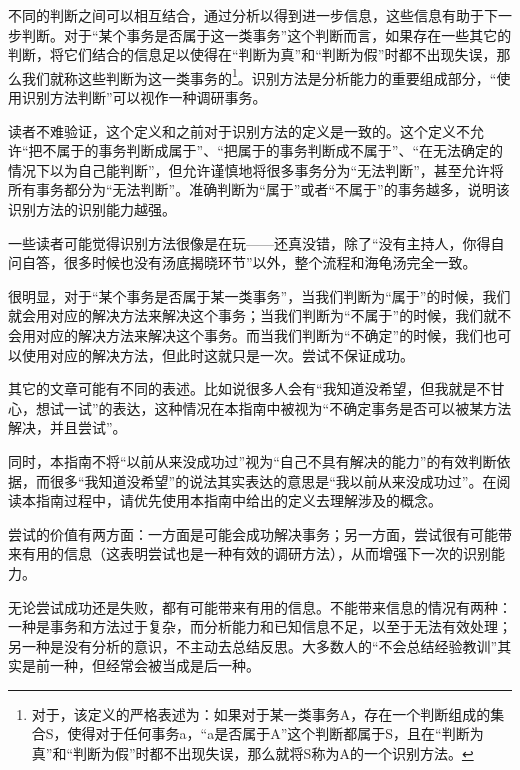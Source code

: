 不同的判断之间可以相互结合，通过分析以得到进一步信息，这些信息有助于下一步判断。对于“某个事务是否属于这一类事务”这个判断而言，如果存在一些其它的判断，将它们结合的信息足以使得在“判断为真”和“判断为假”时都不出现失误，那么我们就称这些判断为这一类事务的\footnote{对于\rigorous，该定义的严格表述为：如果对于某一类事务A，存在一个判断组成的集合S，使得对于任何事务a，“a是否属于A”这个判断都属于S，且在“判断为真”和“判断为假”时都不出现失误，那么就将S称为A的一个识别方法。}。识别方法是分析能力的重要组成部分，“使用识别方法判断”可以视作一种调研事务。
\begin{explain}
读者不难验证，这个定义和之前对于识别方法的定义是一致的。这个定义不允许“把不属于的事务判断成属于”、“把属于的事务判断成不属于”、“在无法确定的情况下以为自己能判断”，但允许谨慎地将很多事务分为“无法判断”，甚至允许将所有事务都分为“无法判断”。准确判断为“属于”或者“不属于”的事务越多，说明该识别方法的识别能力越强。

一些读者可能觉得识别方法很像是在玩——还真没错，除了“没有主持人，你得自问自答，很多时候也没有汤底揭晓环节”以外，整个流程和海龟汤完全一致。
\end{explain}
很明显，对于“某个事务是否属于某一类事务”，当我们判断为“属于”的时候，我们就会用对应的解决方法来解决这个事务；当我们判断为“不属于”的时候，我们就不会用对应的解决方法来解决这个事务。而当我们判断为“不确定”的时候，我们也可以使用对应的解决方法，但此时这就只是一次。尝试不保证成功。
\begin{explain}
    其它的文章可能有不同的表述。比如说很多人会有“我知道没希望，但我就是不甘心，想试一试”的表达，这种情况在本指南中被视为“不确定事务是否可以被某方法解决，并且尝试”。
\end{explain}
\begin{explain}
    同时，本指南不将“以前从来没成功过”视为“自己不具有解决的能力”的有效判断依据，而很多“我知道没希望”的说法其实表达的意思是“我以前从来没成功过”。在阅读本指南过程中，请优先使用本指南中给出的定义去理解涉及的概念。
\end{explain}
尝试的价值有两方面：一方面是可能会成功解决事务；另一方面，尝试很有可能带来有用的信息（这表明尝试也是一种有效的调研方法），从而增强下一次的识别能力。
\begin{explain}
    无论尝试成功还是失败，都有可能带来有用的信息。不能带来信息的情况有两种：一种是事务和方法过于复杂，而分析能力和已知信息不足，以至于无法有效处理；另一种是没有分析的意识，不主动去总结反思。大多数人的“不会总结经验教训”其实是前一种，但经常会被当成是后一种。
\end{explain}

